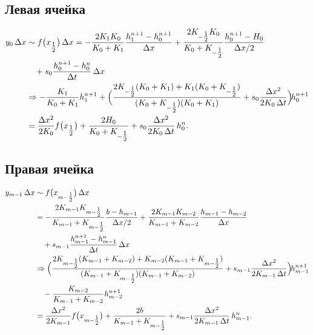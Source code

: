 \documentclass[a4paper,12pt]{article}
\begin{document}
\subsection{Левая ячейка}
\begin{align}
y_0\,\Delta x
&\sim f\bigl(x_{\tfrac12}\bigr)\,\Delta x
= -\frac{2K_1K_0}{K_0+K_1}\frac{h_1^{n+1}-h_0^{n+1}}{\Delta x}
+ \frac{2K_{-\tfrac12}K_0}{K_0+K_{-\tfrac12}}\frac{h_0^{n+1}-H_0}{\Delta x/2}
\nonumber\\
&\quad
+ s_0\frac{h_0^{n+1}-h_0^n}{\Delta t}\,\Delta x
\nonumber\\
&\Rightarrow
- \frac{K_1}{K_0+K_1}h_1^{n+1}
+ \Bigl(
\frac{2K_{-\tfrac12}(K_0+K_1)+K_1(K_0+K_{-\tfrac12})}
{(K_0+K_{-\tfrac12})(K_0+K_1)}
+ s_0\frac{\Delta x^2}{2K_0\,\Delta t}
\Bigr)\!h_0^{n+1}
\nonumber\\
&= \frac{\Delta x^2}{2K_0}f\bigl(x_{\tfrac12}\bigr)
+ \frac{2H_0}{K_0+K_{-\tfrac12}}
+ s_0\frac{\Delta x^2}{2K_0\,\Delta t}\,h_0^n.
\end{align}

\subsection{Правая ячейка}
\begin{align}
y_{m-1}\,\Delta x
&\sim f\bigl(x_{m-\tfrac12}\bigr)\,\Delta x
\nonumber\\
&=
- \frac{2K_{m-1}K_{m-\tfrac12}}{K_{m-1}+K_{m-\tfrac12}}
\frac{b-h_{m-1}}{\Delta x/2}
+ \frac{2K_{m-1}K_{m-2}}{K_{m-1}+K_{m-2}}
\frac{h_{m-1}-h_{m-2}}{\Delta x}
\nonumber\\
&\quad+ s_{m-1}\frac{h_{m-1}^{n+1}-h_{m-1}^n}{\Delta t}\,\Delta x
\nonumber\\
&\Rightarrow
\Bigl(
\frac{2K_{m-\tfrac12}(K_{m-1}+K_{m-2})+K_{m-2}(K_{m-1}+K_{m-\tfrac12})}
{(K_{m-1}+K_{m-\tfrac12})(K_{m-1}+K_{m-2})}
+ s_{m-1}\frac{\Delta x^2}{2K_{m-1}\,\Delta t}
\Bigr)\!h_{m-1}^{n+1}
\nonumber\\
&\quad
- \frac{K_{m-2}}{K_{m-1}+K_{m-2}}h_{m-2}^{n+1}
\nonumber\\
&= \frac{\Delta x^2}{2K_{m-1}}f\bigl(x_{m-\tfrac12}\bigr)
+ \frac{2b}{K_{m-1}+K_{m-\tfrac12}}
+ s_{m-1}\frac{\Delta x^2}{2K_{m-1}\,\Delta t}\,h_{m-1}^n.
\end{align}

\end{document}
